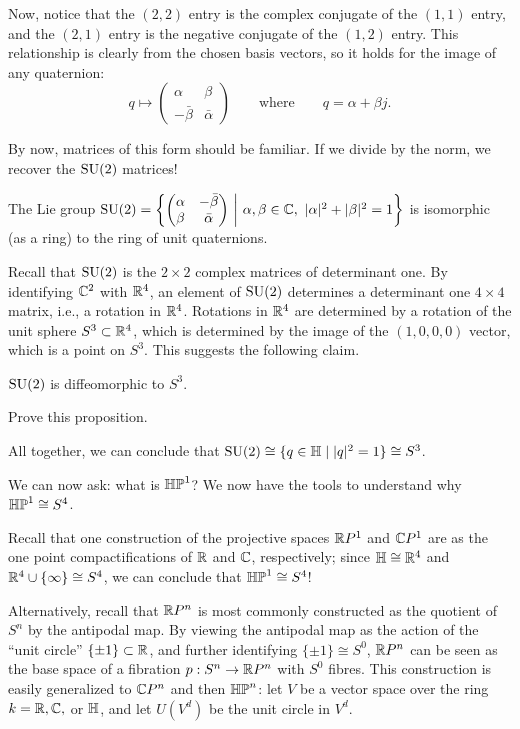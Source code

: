 \documentclass[main]{subfiles}
\begin{document}
Now, notice that the $(2,2)$ entry is the complex conjugate of the $(1,1)$ entry, and the $(2,1)$ entry is the negative conjugate of the $(1,2)$ entry. This relationship is clearly from the chosen basis vectors, so it holds for the image of any quaternion:
\[
q \longmapsto \begin{pmatrix} \alpha & \beta \\ -\bar\beta & \bar\alpha\end{pmatrix} \qquad \text{where} \qquad q = \alpha+\beta j.
\]

By now, matrices of this form should be familiar. If we divide by the norm, we recover the $\operatorname{SU}(2)$ matrices!

\begin{proposition}
The Lie group $\SU(2) = \left\{\begin{pmatrix}\alpha & -\bar\beta \\ \beta & \bar\alpha\end{pmatrix} \ \middle|\ \alpha,\beta\in\CC,\ |\alpha|^2+|\beta|^2=1\right\}$ is isomorphic (as a ring) to the ring of unit quaternions.
\end{proposition}

Recall that $\operatorname{SU}(2)$ is the $2\times 2$ complex matrices of determinant one. By identifying $\mathbb C^2$ with $\mathbb R^4$, an element of $\operatorname{SU}(2)$ determines a determinant one $4\times 4$ matrix, i.e., a rotation in $\mathbb R^4$. Rotations in $\mathbb R^4$ are determined by a rotation of the unit sphere $S^3\subset\mathbb R^4$, which is determined by the image of the $(1,0,0,0)$ vector, which is a point on $S^3$. This suggests the following claim.

\begin{proposition}
$\operatorname{SU}(2)$ is diffeomorphic to $S^3$.
\end{proposition}

\begin{exercise}
Prove this proposition.
\end{exercise}

All together, we can conclude that $\operatorname{SU}(2) \cong \{q\in\mathbb H \mid |q|^2=1\} \cong S^3$.

We can now ask: what is $\mathbb{HP}^1$? We now have the tools to understand why $\mathbb{HP}^1\cong S^4$.

Recall that one construction of the projective spaces $\mathbb R P^1$ and $\mathbb C P^1$ are as the one point compactifications of $\mathbb R$ and $\mathbb C$, respectively; since $\mathbb H\cong\mathbb R^4$ and $\mathbb R^4\cup\{\infty\}\cong S^4$, we can conclude that $\mathbb{HP}^1\cong S^4$!

Alternatively, recall that $\mathbb R P^n$ is most commonly constructed as the quotient of $S^n$ by the antipodal map. By viewing the antipodal map as the action of the ``unit circle'' $\{\pm 1\}\subset\mathbb R$, and further identifying $\{\pm 1\}\cong S^0$, $\mathbb R P^n$ can be seen as the base space of a fibration $p : S^n\to\mathbb R P^n$ with $S^0$ fibres. This construction is easily generalized to $\mathbb C P^n$ and then $\mathbb{HP}^n$: let $V$ be a vector space over the ring $k=\mathbb R,\mathbb C,$ or $\mathbb H$, and let $U(V^d)$ be the unit circle in $V^d$.
\end{document}
